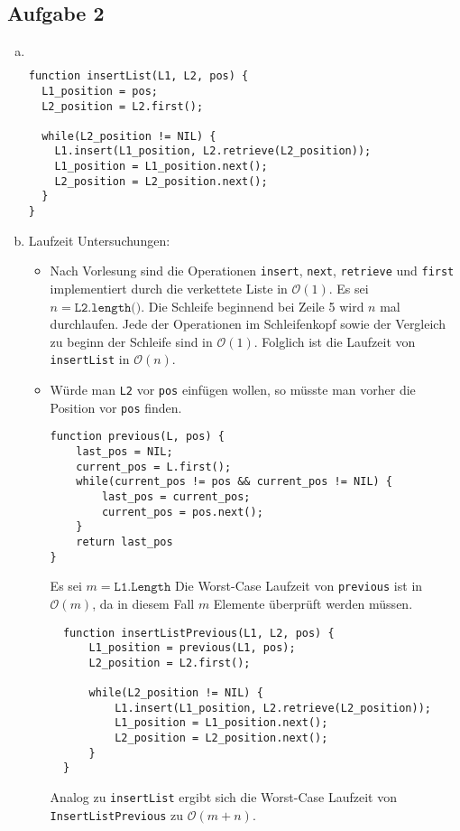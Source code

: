 \documentclass[11pt]{article}
\begin{document}
\subsection*{Aufgabe 2}
\begin{enumerate}[a)]
  \item  $ $
\begin{center}
\begin{lstlisting}
function insertList(L1, L2, pos) {
  L1_position = pos;
  L2_position = L2.first();

  while(L2_position != NIL) {
    L1.insert(L1_position, L2.retrieve(L2_position));
    L1_position = L1_position.next();
    L2_position = L2_position.next();
  }
}
\end{lstlisting}
\end{center}
    
  \item Laufzeit Untersuchungen:
    \begin{itemize}
      \item
        Nach Vorlesung sind die Operationen \texttt{insert}, \texttt{next}, 
        \texttt{retrieve} und \texttt{first} implementiert durch die verkettete
        Liste in $\mathcal{O}(1)$. Es sei $n=\texttt{L2.length()}$. 
        Die Schleife beginnend bei Zeile 5 wird $n$ mal durchlaufen. Jede der 
        Operationen im Schleifenkopf sowie der Vergleich zu beginn der Schleife
        sind in $\mathcal{O}(1)$. Folglich ist die Laufzeit von \texttt{insertList}
        in $\mathcal{O}(n)$.
      \item W\"urde man \texttt{L2} vor \texttt{pos} einf\"ugen wollen, so
        m\"usste man vorher die Position vor \texttt{pos} finden.
\begin{lstlisting}
function previous(L, pos) {
    last_pos = NIL;
    current_pos = L.first();
    while(current_pos != pos && current_pos != NIL) {
        last_pos = current_pos;
        current_pos = pos.next();
    }
    return last_pos
}
\end{lstlisting}
        Es sei $m=\texttt{L1.Length}$ 
        Die Worst-Case Laufzeit von \texttt{previous} ist in $\mathcal{O}(m)$,
        da in diesem Fall $m$ Elemente \"uberpr\"uft werden m\"ussen. 

\begin{lstlisting}
  function insertListPrevious(L1, L2, pos) {
      L1_position = previous(L1, pos);
      L2_position = L2.first();
  
      while(L2_position != NIL) {
          L1.insert(L1_position, L2.retrieve(L2_position));
          L1_position = L1_position.next();
          L2_position = L2_position.next();
      }
  }
\end{lstlisting}
        
        Analog zu \texttt{insertList} ergibt sich die Worst-Case Laufzeit von
        \texttt{InsertListPrevious} zu $\mathcal{O}(m + n)$.

    \end{itemize}
    


    
    
\end{enumerate}
\newpage
\end{document}
